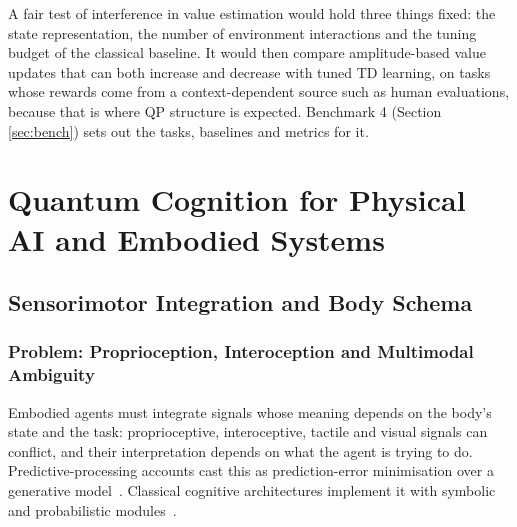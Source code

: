 \documentclass[pdflatex,sn-basic]{sn-jnl}
\begin{document}
A fair test of interference in value estimation would hold three things fixed: the state representation, the number of environment interactions and the tuning budget of the classical baseline. It would then compare amplitude-based value updates that can both increase and decrease with tuned TD learning, on tasks whose rewards come from a context-dependent source such as human evaluations, because that is where QP structure is expected. Benchmark 4 (Section \ref{sec:bench}) sets out the tasks, baselines and metrics for it.


\section{Quantum Cognition for Physical AI and Embodied Systems}\label{sec:robots}

\subsection{Sensorimotor Integration and Body Schema}\label{sec:embodied}

\subsubsection{Problem: Proprioception, Interoception and Multimodal Ambiguity}
Embodied agents must integrate signals whose meaning depends on the body's state and the task: proprioceptive, interoceptive, tactile and visual signals can conflict, and their interpretation depends on what the agent is trying to do. Predictive-processing accounts cast this as prediction-error minimisation over a generative model~\citep{Friston2010,Clark2013}. Classical cognitive architectures implement it with symbolic and probabilistic modules~\citep{Laird2017,Kotseruba2020}.
\end{document}
